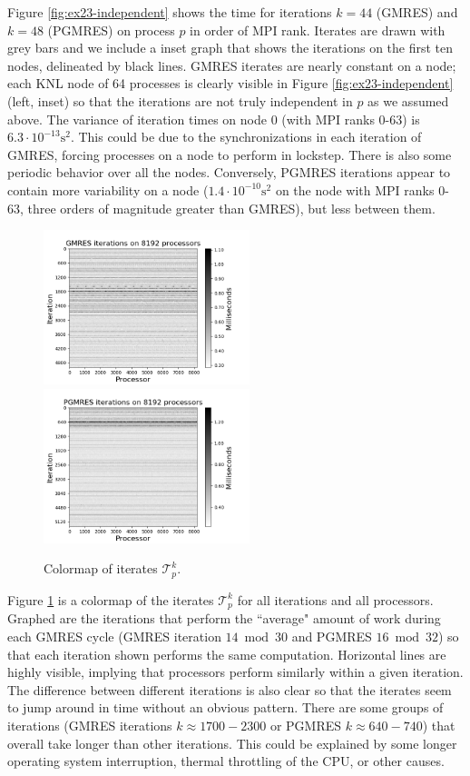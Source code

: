 \documentclass[sigconf]{acmart}
\begin{document}
Figure \ref{fig:ex23-independent} shows the time for iterations $k=44$ (GMRES) and $k=48$ (PGMRES) on process $p$ in order of MPI rank. Iterates are drawn with grey bars and we include a inset graph that shows the iterations on the first ten nodes, delineated by black lines. 
GMRES iterates are nearly constant on a node; each KNL node of 64 processes is clearly visible in Figure \ref{fig:ex23-independent} (left, inset) so that the iterations are not truly independent in $p$ as we assumed above. The variance of iteration times on node 0 (with MPI ranks 0-63) is $6.3\cdot10^{-13} \text{s}^2$. 
This could be due to the synchronizations in each iteration of GMRES, forcing processes on a node to perform in lockstep. 
There is also some periodic behavior over all the nodes.
Conversely, PGMRES iterations appear to contain more variability on a node ($1.4\cdot10^{-10} \text{s}^2$ on the node with MPI ranks 0-63, three orders of magnitude greater than GMRES), but less between them. 

\begin{figure}[b]
\centering
\includegraphics[width=6cm]{../plots/GMRES_ex23_8192_1000000__stationary_in_t_colormap.png}
\includegraphics[width=6cm]{../plots/PGMRES_ex23_8192_1000000__stationary_in_t_colormap.png}
\caption{Colormap of iterates $\mathcal{T}_p^k$.} \label{fig:ex23-stationary}
\end{figure}




Figure \ref{fig:ex23-stationary} is a colormap of the iterates $\mathcal{T}_p^k$ for all iterations and all processors.
Graphed are the iterations that perform the ``average" amount of work during each GMRES cycle (GMRES iteration $14 \bmod 30$ and PGMRES $16 \bmod 32$) so that each iteration shown performs the same computation. 
Horizontal lines are highly visible, implying that processors perform similarly within a given iteration. 
The difference between different iterations is also clear so that the iterates seem to jump around in time without an obvious pattern.
There are some groups of iterations (GMRES iterations $k \approx 1700 - 2300$ or PGMRES $k \approx 640 - 740$) that overall take longer than other iterations. This could be explained by some longer operating system interruption, thermal throttling of the CPU, or other causes.
\end{document}
